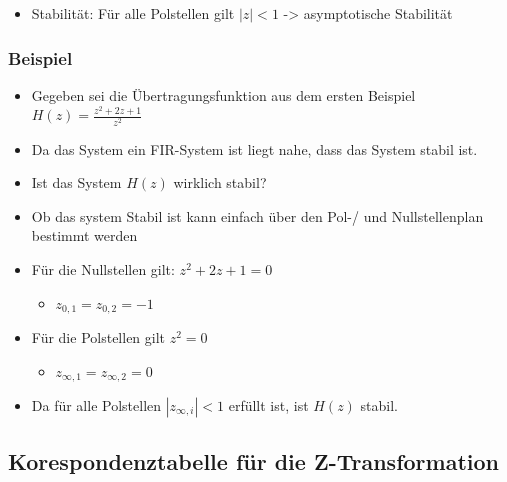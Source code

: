 \documentclass[11pt]{article}
\providecommand{\tightlist}{%
      \setlength{\itemsep}{0pt}\setlength{\parskip}{0pt}}
\begin{document}
    \begin{itemize}
\tightlist
\item
  Stabilität: Für alle Polstellen gilt \(|z| < 1\) -\textgreater{}
  asymptotische Stabilität
\end{itemize}

    \subsubsection{Beispiel}\label{beispiel}

\begin{itemize}
\item
  Gegeben sei die Übertragungsfunktion aus dem ersten Beispiel
  \(H(z) = \frac{z^2 + 2z + 1}{z^2}\)
\item
  Da das System ein FIR-System ist liegt nahe, dass das System stabil
  ist.
\item
  Ist das System \(H(z)\) wirklich stabil?
\item
  Ob das system Stabil ist kann einfach über den Pol-/ und
  Nullstellenplan bestimmt werden
\item
  Für die Nullstellen gilt: \(z^2 + 2z + 1 = 0\)

  \begin{itemize}
  \tightlist
  \item
    \(z_{0,1} = z_{0,2} = -1\)
  \end{itemize}
\item
  Für die Polstellen gilt \(z^2 = 0\)

  \begin{itemize}
  \tightlist
  \item
    \(z_{\infty,1} = z_{\infty,2} = 0\)
  \end{itemize}
\item
  Da für alle Polstellen \(|z_{\infty,i}| < 1\) erfüllt ist, ist
  \(H(z)\) stabil.
\end{itemize}

    \subsection{Korespondenztabelle für die
Z-Transformation}\label{korespondenztabelle-fuxfcr-die-z-transformation}
\end{document}
